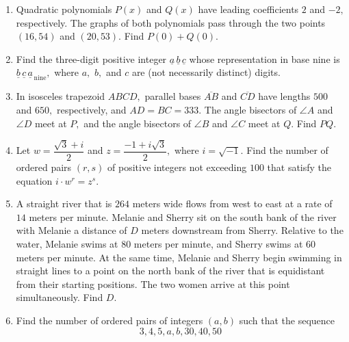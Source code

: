 \documentclass{article}
\begin{document}
\begin{enumerate}[label=\arabic*., itemsep=0.5em]
\item Quadratic polynomials \(P(x)\) and \(Q(x)\) have leading coefficients \(2\) and \(-2,\) respectively. The graphs of both polynomials pass through the two points \((16,54)\) and \((20,53).\) Find \(P(0) + Q(0).\)\par \vspace{0.5em}\item Find the three-digit positive integer \(\underline{a}\,\underline{b}\,\underline{c}\) whose representation in base nine is \(\underline{b}\,\underline{c}\,\underline{a}_{\,\text{nine}},\) where \(a,\) \(b,\) and \(c\) are (not necessarily distinct) digits.\par \vspace{0.5em}\item In isosceles trapezoid \(ABCD,\) parallel bases \(\overline{AB}\) and \(\overline{CD}\) have lengths \(500\) and \(650,\) respectively, and \(AD=BC=333.\) The angle bisectors of \(\angle A\) and \(\angle D\) meet at \(P,\) and the angle bisectors of \(\angle B\) and \(\angle C\) meet at \(Q.\) Find \(PQ.\)\par \vspace{0.5em}\item Let \(w = \dfrac{\sqrt{3} + i}{2}\) and \(z = \dfrac{-1 + i\sqrt{3}}{2},\) where \(i = \sqrt{-1}.\) Find the number of ordered pairs \((r,s)\) of positive integers not exceeding \(100\) that satisfy the equation \(i \cdot w^r = z^s.\)\par \vspace{0.5em}\item A straight river that is \(264\) meters wide flows from west to east at a rate of \(14\) meters per minute. Melanie and Sherry sit on the south bank of the river with Melanie a distance of \(D\) meters downstream from Sherry. Relative to the water, Melanie swims at \(80\) meters per minute, and Sherry swims at \(60\) meters per minute. At the same time, Melanie and Sherry begin swimming in straight lines to a point on the north bank of the river that is equidistant from their starting positions. The two women arrive at this point simultaneously. Find \(D.\)\par \vspace{0.5em}\item Find the number of ordered pairs of integers \((a,b)\) such that the sequence 
\begin{equation*}
3,4,5,a,b,30,40,50
\end{equation*}

\end{enumerate}
\end{document}

